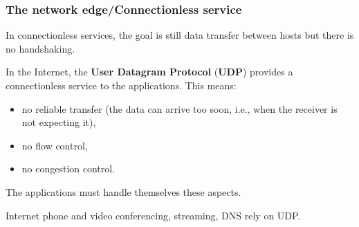 %
\begin{frame}
\frametitle{The network edge/Connectionless service}

In connectionless services, the goal is still data transfer between
hosts but there is no handshaking.

In the Internet, the \textbf{User Datagram Protocol} (\textbf{UDP})
provides a connectionless service to the applications. This means:

\begin{itemize}

  \item no reliable transfer (the data can arrive too soon, i.e., when
  the receiver is not expecting it),

  \item no flow control,

  \item no congestion control.

\end{itemize}

The applications must handle themselves these aspects.

Internet phone and video conferencing, streaming, DNS rely on UDP.

\end{frame}
